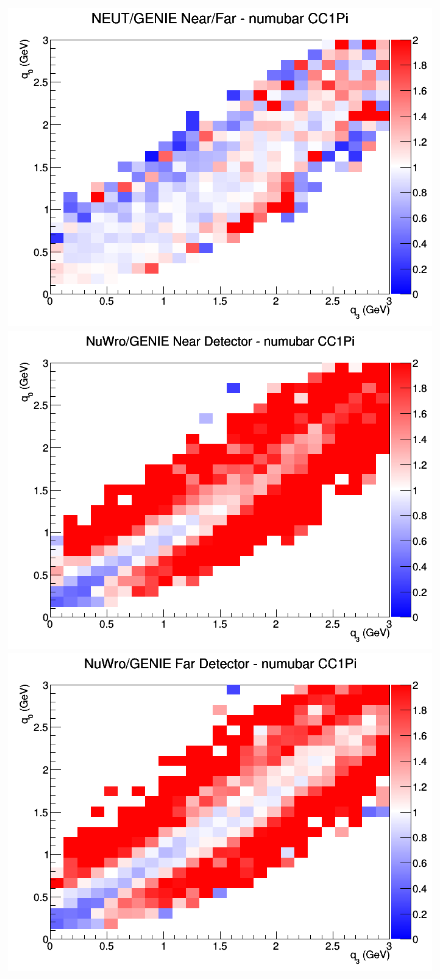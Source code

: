 \begin{figure}[h]
\endminipage
{}
\includegraphics[width=\linewidth]{eff_q0_q3/LAr/ratios/CC1Pi_NEUT_GENIE_numubar_NF_q3_q0.png}
\endminipage
\newline
{}
\includegraphics[width=\linewidth]{eff_q0_q3/LAr/ratios/CC1Pi_NuWro_GENIE_numubar_near_q3_q0.png}
\endminipage
{}
\includegraphics[width=\linewidth]{eff_q0_q3/LAr/ratios/CC1Pi_NuWro_GENIE_numubar_far_q3_q0.png}

\end{figure}
